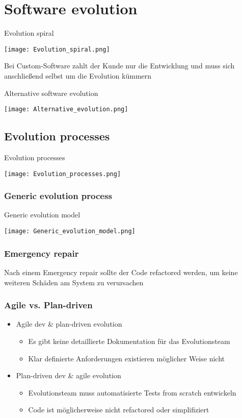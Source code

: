 \section{Software evolution}
\begin{table}[H]
\caption{Evolution spiral}
\begin{center}
\texttt{[image: Evolution\_spiral.png]}	
\end{center}
\end{table}
Bei Custom-Software zahlt der Kunde nur die Entwicklung und muss sich anschließend selbst um die Evolution kümmern
\begin{table}[H]
\caption{Alternative software evolution}	
\texttt{[image: Alternative\_evolution.png]}
\end{table}
\subsection{Evolution processes}
\begin{table}[H]
\caption{Evolution processes}
\begin{center}
\texttt{[image: Evolution\_processes.png]}		
\end{center}
\end{table}
\subsubsection{Generic evolution process}
\begin{table}[H]
\caption{Generic evolution model}
\texttt{[image: Generic\_evolution\_model.png]}	
\end{table}
\subsubsection{Emergency repair}
Nach einem Emergency repair sollte der Code refactored werden, um keine weiteren Schäden am System zu verursachen
\subsubsection{Agile vs. Plan-driven}
\begin{itemize}
	\item Agile dev \& plan-driven evolution
		\begin{itemize}
			\item Es gibt keine detaillierte Dokumentation für das Evolutionsteam
			\item Klar definierte Anforderungen existieren möglicher Weise nicht
		\end{itemize}
	\item Plan-driven dev \& agile evolution 
		\begin{itemize}
			\item Evolutionsteam muss automatisierte Tests from scratch entwickeln
	 		\item Code ist möglicherweise nicht refactored oder simplifiziert
 		\end{itemize}
\end{itemize}
